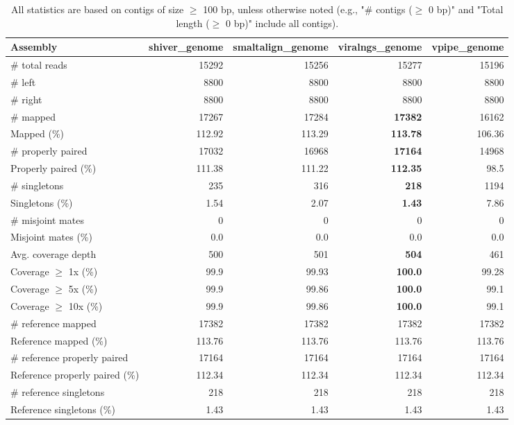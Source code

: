\documentclass[12pt,a4paper]{article}
\begin{document}
\begin{table}[ht]
\begin{center}
\caption{All statistics are based on contigs of size $\geq$ 100 bp, unless otherwise noted (e.g., "\# contigs ($\geq$ 0 bp)" and "Total length ($\geq$ 0 bp)" include all contigs).}
\begin{tabular}{|l*{4}{|r}|}
\hline
Assembly & shiver\_genome & smaltalign\_genome & viralngs\_genome & vpipe\_genome \\ \hline
\# total reads & 15292 & 15256 & 15277 & 15196 \\ \hline
\# left & 8800 & 8800 & 8800 & 8800 \\ \hline
\# right & 8800 & 8800 & 8800 & 8800 \\ \hline
\# mapped & 17267 & 17284 & {\bf 17382} & 16162 \\ \hline
Mapped (\%) & 112.92 & 113.29 & {\bf 113.78} & 106.36 \\ \hline
\# properly paired & 17032 & 16968 & {\bf 17164} & 14968 \\ \hline
Properly paired (\%) & 111.38 & 111.22 & {\bf 112.35} & 98.5 \\ \hline
\# singletons & 235 & 316 & {\bf 218} & 1194 \\ \hline
Singletons (\%) & 1.54 & 2.07 & {\bf 1.43} & 7.86 \\ \hline
\# misjoint mates & 0 & 0 & 0 & 0 \\ \hline
Misjoint mates (\%) & 0.0 & 0.0 & 0.0 & 0.0 \\ \hline
Avg. coverage depth & 500 & 501 & {\bf 504} & 461 \\ \hline
Coverage $\geq$ 1x (\%) & 99.9 & 99.93 & {\bf 100.0} & 99.28 \\ \hline
Coverage $\geq$ 5x (\%) & 99.9 & 99.86 & {\bf 100.0} & 99.1 \\ \hline
Coverage $\geq$ 10x (\%) & 99.9 & 99.86 & {\bf 100.0} & 99.1 \\ \hline
\# reference mapped & 17382 & 17382 & 17382 & 17382 \\ \hline
Reference mapped (\%) & 113.76 & 113.76 & 113.76 & 113.76 \\ \hline
\# reference properly paired & 17164 & 17164 & 17164 & 17164 \\ \hline
Reference properly paired (\%) & 112.34 & 112.34 & 112.34 & 112.34 \\ \hline
\# reference singletons & 218 & 218 & 218 & 218 \\ \hline
Reference singletons (\%) & 1.43 & 1.43 & 1.43 & 1.43 \\ \hline

\end{tabular}
\end{center}
\end{table}
\end{document}
